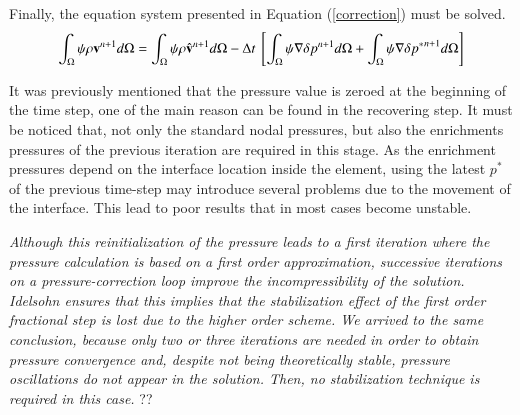 Finally, the equation system presented in Equation (\ref{correction}) must be solved.
 \begin{equation}
  \int_{\Omega} \psi \rho \vv^{n+1} d\Omega = \int_{\Omega} \psi \rho \hat{\vv}^{n+1} d\Omega - \Delta t \ \left[\int_{\Omega} \psi \nabla \delta p^{n+1} d\Omega + \int_{\Omega} \psi \nabla \delta {p^*}^{n+1} d\Omega \right]
  \label{correction}
 \end{equation}

It was previously mentioned that the pressure value is zeroed at the beginning of the time step, one of the main reason can be found in the recovering step. It must be noticed that, not only the standard nodal pressures, but also the enrichments pressures of the previous iteration are required in this stage. As the enrichment pressures depend on the interface location inside the element, using the latest $p^*$ of the previous time-step may introduce several problems due to the movement of the interface. This lead to poor results that in most cases become unstable.

\emph{Although this reinitialization of the pressure leads to a first iteration where the pressure calculation is based on a first order approximation, successive iterations on a pressure-correction loop improve the incompressibility of the solution. Idelsohn\cite{Idelsohn13c} ensures that this implies that the stabilization effect of the first order fractional step is lost due to the higher order scheme. We arrived to the same conclusion, because only two or three iterations are needed in order to obtain pressure convergence and, despite not being theoretically stable, pressure oscillations do not appear in the solution. Then, no stabilization technique is required in this case.} ?? 